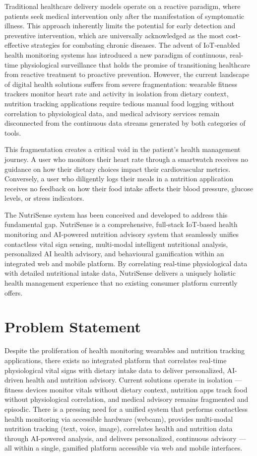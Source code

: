 \documentclass[12pt,a4paper]{report}
\begin{document}
Traditional healthcare delivery models operate on a reactive paradigm, where patients seek medical intervention only after the manifestation of symptomatic illness. This approach inherently limits the potential for early detection and preventive intervention, which are universally acknowledged as the most cost-effective strategies for combating chronic diseases. The advent of IoT-enabled health monitoring systems has introduced a new paradigm of continuous, real-time physiological surveillance that holds the promise of transitioning healthcare from reactive treatment to proactive prevention. However, the current landscape of digital health solutions suffers from severe fragmentation: wearable fitness trackers monitor heart rate and activity in isolation from dietary context, nutrition tracking applications require tedious manual food logging without correlation to physiological data, and medical advisory services remain disconnected from the continuous data streams generated by both categories of tools.

This fragmentation creates a critical void in the patient's health management journey. A user who monitors their heart rate through a smartwatch receives no guidance on how their dietary choices impact their cardiovascular metrics. Conversely, a user who diligently logs their meals in a nutrition application receives no feedback on how their food intake affects their blood pressure, glucose levels, or stress indicators.

The NutriSense system has been conceived and developed to address this fundamental gap. NutriSense is a comprehensive, full-stack IoT-based health monitoring and AI-powered nutrition advisory system that seamlessly unifies contactless vital sign sensing, multi-modal intelligent nutritional analysis, personalized AI health advisory, and behavioural gamification within an integrated web and mobile platform. By correlating real-time physiological data with detailed nutritional intake data, NutriSense delivers a uniquely holistic health management experience that no existing consumer platform currently offers.

\section{Problem Statement}
Despite the proliferation of health monitoring wearables and nutrition tracking applications, there exists no integrated platform that correlates real-time physiological vital signs with dietary intake data to deliver personalized, AI-driven health and nutrition advisory. Current solutions operate in isolation --- fitness devices monitor vitals without dietary context, nutrition apps track food without physiological correlation, and medical advisory remains fragmented and episodic. There is a pressing need for a unified system that performs contactless health monitoring via accessible hardware (webcam), provides multi-modal nutrition tracking (text, voice, image), correlates health and nutrition data through AI-powered analysis, and delivers personalized, continuous advisory --- all within a single, gamified platform accessible via web and mobile interfaces.
\end{document}
